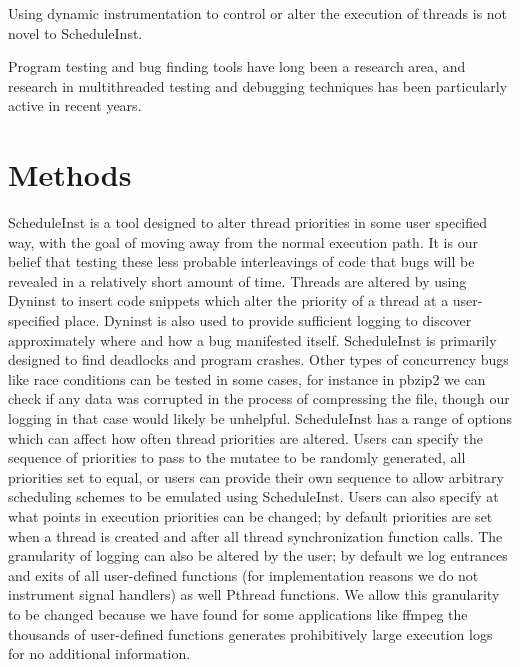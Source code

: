 \documentclass[10pt,]{article} %
\begin{document}
Using dynamic instrumentation to control or alter the execution of threads is not novel to ScheduleInst.  

Program testing and bug finding tools have long been a research area, and research in multithreaded testing and debugging techniques has been particularly active in recent years.  



\section{Methods}

	ScheduleInst is a tool designed to alter thread priorities in some user specified way, with the goal of moving away from the normal execution path.  It is our belief that testing these less probable interleavings of code that bugs will be revealed in a relatively short amount of time.  Threads are altered by using Dyninst to insert code snippets which alter the priority of a thread at a user-specified place. Dyninst is also used to provide sufficient logging to discover approximately where and how a bug manifested itself. ScheduleInst is primarily designed to find deadlocks and program crashes.  Other types of concurrency bugs like race conditions can be tested in some cases, for instance in pbzip2 we can check if any data was corrupted in the process of compressing the file, though our logging in that case would likely be unhelpful.  
	ScheduleInst has a range of options which can affect how often thread priorities are altered.  Users can specify the sequence of priorities to pass to the mutatee to be randomly generated, all priorities set to equal, or users can provide their own sequence to allow arbitrary scheduling schemes to be emulated using ScheduleInst.  Users can also specify at what points in execution priorities can be changed; by default priorities are set when a thread is created and after all thread synchronization function calls.  The granularity of logging can also be altered by the user; by default we log entrances and exits of all user-defined functions (for implementation reasons we do not instrument signal handlers) as well Pthread functions.  We allow this granularity to be changed because we have found for some applications like ffmpeg the thousands of user-defined functions generates prohibitively large execution logs for no additional information.    
\end{document}
